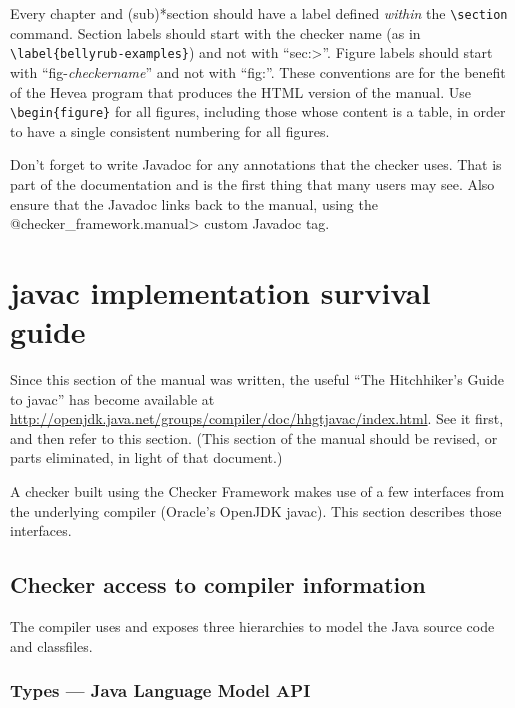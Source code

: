 Every chapter and (sub)*section should have a label defined \emph{within} the
\verb|\section| command.  Section labels should start with the checker
name (as in \verb|\label{bellyrub-examples}|) and not with ``\<sec:>''.
Figure labels should start with ``fig-\emph{checkername}'' and not with ``fig:''.
These conventions are for the benefit of the Hevea program that produces
the HTML version of the manual.
Use \verb|\begin{figure}| for all figures, including those whose
content is a table, in order to have a single consistent numbering for all
figures.

Don't forget to write Javadoc for any annotations that the checker uses.
That is part of the documentation and is the first thing that many users
may see.  Also ensure that the Javadoc links back to the manual, using the
\<@checker\_framework.manual> custom Javadoc tag.

\section{javac implementation survival guide\label{creating-javac-tips}}

Since this section of the manual was written, the useful ``The Hitchhiker's
Guide to javac'' has become available at
\url{http://openjdk.java.net/groups/compiler/doc/hhgtjavac/index.html}.
See it first, and then refer to this section.  (This section of the manual
should be revised, or parts eliminated, in light of that document.)


A checker built using the Checker Framework makes use of a few interfaces
from the underlying compiler (Oracle's OpenJDK javac).
This section describes those interfaces.




\subsection{Checker access to compiler information\label{creating-compiler-information}}

The compiler uses and exposes three hierarchies to model the Java
source code and classfiles.


\subsubsection{Types --- Java Language Model API\label{creating-javac-types}}

